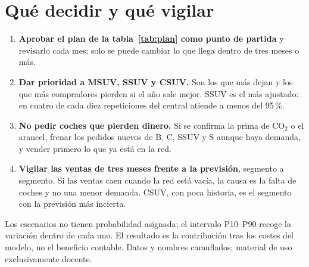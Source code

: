 \documentclass[10pt,a4paper]{article}
\begin{document}
\vspace{-2mm}
\section{Qué decidir y qué vigilar}
\begin{enumerate}
\item \textbf{Aprobar el plan de la tabla~\ref{tab:plan} como punto de partida} y
  revisarlo cada mes: solo se puede cambiar lo que llega dentro de tres meses o más.
\item \textbf{Dar prioridad a MSUV, SSUV y CSUV.} Son los que más dejan y los que
  más compradores pierden si el año sale mejor. SSUV es el más ajustado: en cuatro
  de cada diez repeticiones del central atiende a menos del 95\,\%.
\item \textbf{No pedir coches que pierden dinero.} Si se confirma la prima de
  CO$_2$ o el arancel, frenar los pedidos nuevos de B, C, SSUV y S aunque haya
  demanda, y vender primero lo que ya está en la red.
\item \textbf{Vigilar las ventas de tres meses frente a la previsión}, segmento a
  segmento. Si las ventas caen cuando la red está vacía, la causa es la falta de
  coches y no una menor demanda.
  CSUV, con poca historia, es el segmento con la previsión más incierta.
\end{enumerate}

{\footnotesize\color{gris}Los escenarios no tienen probabilidad asignada; el
intervalo P10--P90 recoge la variación dentro de cada uno. El resultado es la
contribución tras los costes del modelo, no el beneficio contable. Datos y nombres
camuflados; material de uso exclusivamente docente.\par}
\end{document}
